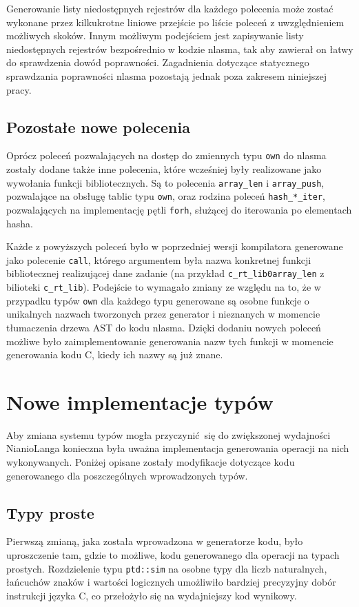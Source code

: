 \documentclass[licencjacka]{pracamgr}
\begin{document}
Generowanie listy niedostępnych rejestrów dla każdego polecenia może zostać wykonane przez kilkukrotne
liniowe przejście po liście poleceń z uwzględnieniem możliwych skoków.
Innym możliwym podejściem jest zapisywanie listy niedostępnych rejestrów bezpośrednio
w kodzie nlasma, tak aby zawierał on łatwy do sprawdzenia dowód poprawności.
Zagadnienia dotyczące statycznego sprawdzania poprawności nlasma pozostają jednak poza zakresem niniejszej
pracy.

\section{Pozostałe nowe polecenia}
Oprócz poleceń pozwalających na dostęp do zmiennych typu \texttt{own} do nlasma zostały dodane także inne 
polecenia, które wcześniej były realizowane jako wywołania funkcji bibliotecznych.
Są to polecenia \texttt{array\_len} i \texttt{array\_push}, pozwalające na obsługę tablic typu \texttt{own},
oraz rodzina poleceń \texttt{hash\_*\_iter}, pozwalających na implementację pętli \texttt{forh},
służącej do iterowania po elementach hasha.

Każde z powyższych poleceń było w poprzedniej wersji kompilatora generowane jako polecenie \texttt{call},
którego argumentem była nazwa konkretnej funkcji bibliotecznej realizującej dane zadanie (na przykład
\texttt{c\_rt\_lib0array\_len} z bilioteki \texttt{c\_rt\_lib}). Podejście to wymagało zmiany ze względu
na to, że w przypadku typów \texttt{own} dla każdego typu generowane są osobne funkcje o unikalnych
nazwach tworzonych przez generator i nieznanych w momencie tłumaczenia drzewa AST do kodu nlasma.
Dzięki dodaniu nowych poleceń możliwe było zaimplementowanie generowania nazw tych funkcji w momencie
generowania kodu C, kiedy ich nazwy są już znane.

\chapter{Nowe implementacje typów}
Aby zmiana systemu typów mogła przyczynić się do zwiększonej wydajności NianioLanga konieczna była uważna
implementacja generowania operacji na nich wykonywanych.
Poniżej opisane zostały modyfikacje dotyczące kodu generowanego dla poszczególnych wprowadzonych typów.
\section{Typy proste}
Pierwszą zmianą, jaka została wprowadzona w generatorze kodu, było uproszczenie
tam, gdzie to możliwe, kodu generowanego dla operacji na typach prostych.
Rozdzielenie typu \texttt{ptd::sim} na osobne typy dla liczb naturalnych,
łańcuchów znaków i wartości logicznych umożliwiło bardziej precyzyjny dobór instrukcji języka C,
co przełożyło się na wydajniejszy kod wynikowy.
\end{document}
